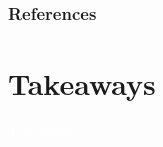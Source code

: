 \documentclass[11pt,table]{beamer}
\begin{document}
%
%
%
%
%
%
%
%
%




\begin{frame}[t,allowframebreaks
]%
\frametitle{References}
\small

\end{frame}
\section{Takeaways}
{
\begin{frame}
\centering
\Huge
\textcolor{white}{Takeaways}
\thispagestyle{empty}
\end{frame}
}
\end{document}
